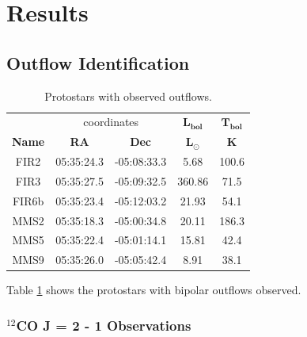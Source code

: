 \section{Results}


\subsection{Outflow Identification}

\begin{table}[h!]
	\caption{Protostars with observed outflows.}
	\label{table:protostars}
	\begin{center}
		\begin{tabular}{c|c|c|c|c}
			\toprule
			& \multicolumn{2}{c|}{coordinates} & $\mathbf{L_{bol}}$ & $\mathbf{T_{bol}}$\\
			\textbf{Name} & \textbf{RA} & \textbf{Dec} & $\mathbf{L_{\odot}}$ & $\mathbf{K}$\\
			\midrule
			\centering
			FIR2 & 05:35:24.3 & -05:08:33.3 & 5.68 & 100.6\\
			FIR3 & 05:35:27.5 & -05:09:32.5 & 360.86 & 71.5\\
			FIR6b & 05:35:23.4 & -05:12:03.2 & 21.93 & 54.1\\
			MMS2 & 05:35:18.3 & -05:00:34.8 & 20.11 & 186.3\\
			MMS5 & 05:35:22.4 & -05:01:14.1 & 15.81 & 42.4\\
			MMS9 & 05:35:26.0 & -05:05:42.4 & 8.91 & 38.1\\
			\midrule
		\end{tabular}
	\end{center}
\end{table}
Table \ref{table:protostars} shows the protostars with bipolar outflows observed. 

\subsubsection{$^{12}$CO J = 2 - 1 Observations}

